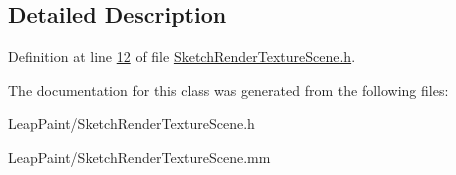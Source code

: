 \subsection{Detailed Description}


Definition at line \hyperlink{_sketch_render_texture_scene_8h_source_l00012}{12} of file \hyperlink{_sketch_render_texture_scene_8h_source}{Sketch\-Render\-Texture\-Scene.\-h}.



The documentation for this class was generated from the following files\-:\begin{DoxyCompactItemize}
\item 
Leap\-Paint/Sketch\-Render\-Texture\-Scene.\-h\item 
Leap\-Paint/Sketch\-Render\-Texture\-Scene.\-mm\end{DoxyCompactItemize}
